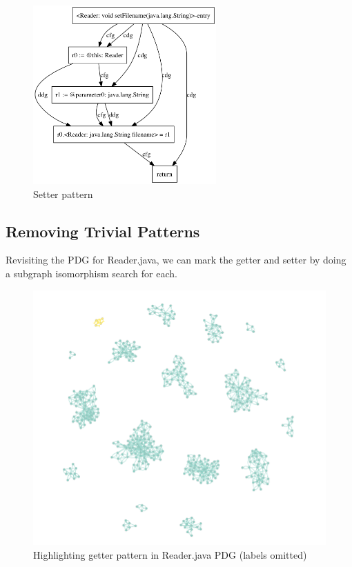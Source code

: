 \documentclass[12pt]{article}
\begin{document}
\begin{figure}[ht]
\centerline{
\includegraphics[width=7cm]{patterns/reader_setter.png}
}
\caption{\label{reader_setter}
    Setter pattern
}
\end{figure}

\subsection{Removing Trivial Patterns}
Revisiting the PDG for Reader.java, we can mark the getter and setter by doing a subgraph isomorphism search for each.

\begin{figure}[ht]
\centerline{
\includegraphics[width=\linewidth]{patterns/reader_getter_isomorphism.png}
}
\caption{\label{reader_getter_isomorphism}
    Highlighting getter pattern in Reader.java PDG (labels omitted)
}
\end{figure}
\end{document}
